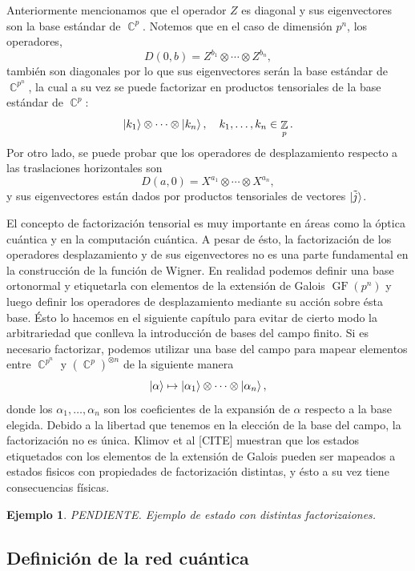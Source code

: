 \documentclass[a4paper]{report}
\DeclareMathOperator{\C}{\mathbb{C}}
\DeclareMathOperator{\Z}{\mathbb{Z}}
\DeclareMathOperator{\GF}{GF}
\newtheorem{example}{Ejemplo}
\begin{document}
  Anteriormente mencionamos que el operador $Z$ es diagonal
  y sus eigenvectores son la base estándar de $\C^{p}$.
  Notemos que en el caso de dimensión $p^{n}$, los
  operadores, 
  \[
    D(0,b) = Z^{b_1} \otimes \cdots \otimes Z^{b_n},
  \] 
  también son diagonales por lo que sus eigenvectores serán
  la base estándar de $\C^{p^{n}}$, la cual a su vez se
  puede factorizar en productos tensoriales de la base
  estándar de $\C^{p}$:
  \[
    \ket{k_1} \otimes \cdots \otimes \ket{k_n},
    \quad k_1,\ldots,k_n \in \Z_p.
  \] 
  Por otro lado, se puede probar que los operadores de
  desplazamiento respecto a las traslaciones horizontales
  son
  \[
    D(a,0) = X^{a_1} \otimes \cdots \otimes X^{a_n},
  \] 
  y sus eigenvectores están dados por productos tensoriales
  de vectores $\ket{\tilde j}$.

  El concepto de factorización tensorial es muy importante
  en áreas como la óptica cuántica y en la computación
  cuántica. A pesar de ésto, la factorización de los
  operadores desplazamiento y de sus eigenvectores no es una
  parte fundamental en la construcción de la función de
  Wigner. En realidad podemos definir una base ortonormal y
  etiquetarla con elementos de la extensión de Galois
  $\GF\left(p^{n}\right)$ y luego definir los operadores de
  desplazamiento mediante su acción sobre ésta base. Ésto lo
  hacemos en el siguiente capítulo para evitar de cierto
  modo la arbitrariedad que conlleva la introducción de
  bases del campo finito. Si es necesario factorizar,
  podemos utilizar una base del campo para mapear elementos
  entre $\C^{p^{n}}$ y $\left(\C^{p}\right)^{\otimes n}$ de
  la siguiente manera
  \[
    \ket \alpha
    \mapsto \ket{\alpha_1} \otimes \cdots \otimes
    \ket{\alpha_n},
  \] 
  donde los $\alpha_1,\ldots,\alpha_n$ son los coeficientes
  de la expansión de $\alpha$ respecto a la base elegida.
  Debido a la libertad que tenemos en la elección de la base
  del campo, la factorización no es única. Klimov et al
  [CITE] muestran que los estados etiquetados con los
  elementos de la extensión de Galois pueden ser mapeados a
  estados fisicos con propiedades de factorización
  distintas, y ésto a su vez tiene consecuencias físicas.
  \begin{example}
    PENDIENTE. Ejemplo de estado con distintas factorizaiones.
  \end{example}

  \subsection{Definición de la red cuántica}
\end{document}
